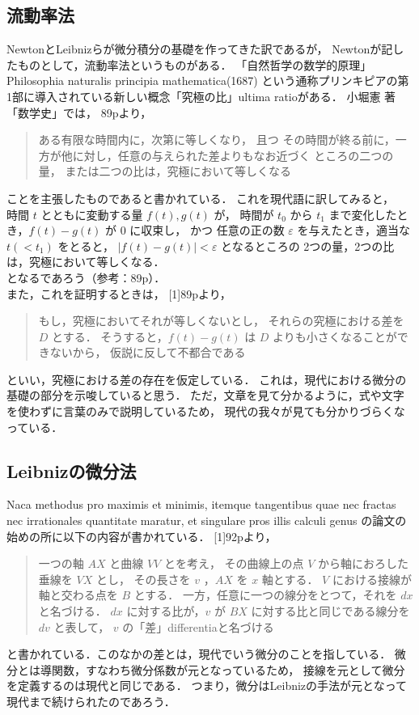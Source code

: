 \documentclass[11pt, a4paper]{jarticle}
\theoremstyle{definition}
\begin{document}
		\subsection{流動率法}
			NewtonとLeibnizらが微分積分の基礎を作ってきた訳であるが，
			Newtonが記したものとして，流動率法というものがある．
			「自然哲学の数学的原理」Philosophia naturalis principia mathematica(1687)
			という通称プリンキピアの第1部に導入されている新しい概念「究極の比」ultima ratioがある．
			小堀憲 著「数学史」では，
			\cite{Obori:Sugakushi}89pより，
			\begin{quotation}
				ある有限な時間内に，次第に等しくなり，
				且つ
				その時間が終る前に，一方が他に対し，任意の与えられた差よりもなお近づく
				ところの二つの量，
				または二つの比は，究極において等しくなる
			\end{quotation}
			ことを主張したものであると書かれている．
			これを現代語に訳してみると，\\
			\quad
			時間 $t$ とともに変動する量 $f(t), g(t)$ が，
			時間が $t_0$ から $t_1$ まで変化したとき，$f(t)-g(t)$ が $0$ に収束し，
			かつ
			任意の正の数 $\varepsilon$ を与えたとき，適当な $t (< t_1)$ をとると，
			$|f(t) - g(t)| < \varepsilon$ となるところの
			2つの量，2つの比は，究極において等しくなる． \\
			となるであろう（参考：\cite{Obori:Sugakushi}89p）． \\
			また，これを証明するときは，
			[1]89pより，
			\begin{quotation}
				もし，究極においてそれが等しくないとし，
				それらの究極における差を $D$ とする．
				そうすると，$f(t) - g(t)$ は $D$ よりも小さくなることができないから，
				仮説に反して不都合である
			\end{quotation}
			といい，究極における差の存在を仮定している．
			これは，現代における微分の基礎の部分を示唆していると思う．
			ただ，文章を見て分かるように，式や文字を使わずに言葉のみで説明しているため，
			現代の我々が見ても分かりづらくなっている．
			
		\subsection{Leibnizの微分法}
			Naca methodus pro maximis et minimis,
			itemque tangentibus quae nec fractas nec irrationales quantitate maratur,
			et singulare pros illis calculi genus
			の論文の始めの所に以下の内容が書かれている．
			[1]92pより，
			\begin{quotation}
				一つの軸 $AX$ と曲線 $VV$ とを考え，
				その曲線上の点 $V$ から軸におろした垂線を $VX$ とし，
				その長さを $v$ ，$AX$ を $x$ 軸とする．
				$V$ における接線が軸と交わる点を $B$ とする．
				一方，任意に一つの線分をとつて，それを $dx$ と名づける．
				$dx$ に対する比が，$v$ が $BX$ に対する比と同じである線分を $dv$ と表して，
				$v$ の「差」differentiaと名づける
			\end{quotation}
			と書かれている．このなかの差とは，現代でいう微分のことを指している．
			微分とは導関数，すなわち微分係数が元となっているため，
			接線を元として微分を定義するのは現代と同じである．
			つまり，微分はLeibnizの手法が元となって現代まで続けられたのであろう．
			
\end{document}
